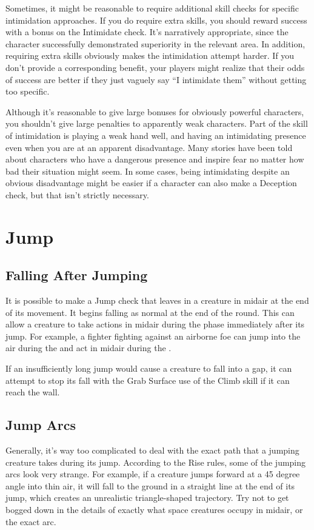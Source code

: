     Sometimes, it might be reasonable to require additional skill checks for specific intimidation approaches.
    If you do require extra skills, you should reward success with a bonus on the Intimidate check.
    It's narratively appropriate, since the character successfully demonstrated superiority in the relevant area.
    In addition, requiring extra skills obviously makes the intimidation attempt harder.
    If you don't provide a corresponding benefit, your players might realize that their odds of success are better if they just vaguely say ``I intimidate them'' without getting too specific.

    Although it's reasonable to give large bonuses for obviously powerful characters, you shouldn't give large penalties to apparently weak characters.
    Part of the skill of intimidation is playing a weak hand well, and having an intimidating presence even when you are at an apparent disadvantage.
    Many stories have been told about characters who have a dangerous presence and inspire fear no matter how bad their situation might seem.
    In some cases, being intimidating despite an obvious disadvantage might be easier if a character can also make a Deception check, but that isn't strictly necessary.

\section{Jump}\label{Jump}

    \subsection{Falling After Jumping}
        It is possible to make a Jump check that leaves in a creature in midair at the end of its movement.
        It begins falling as normal at the end of the round.
        This can allow a creature to take actions in midair during the phase immediately after its jump.
        For example, a fighter fighting against an airborne foe can jump into the air during the  and act in midair during the .

        If an insufficiently long jump would cause a creature to fall into a gap, it can attempt to stop its fall with the Grab Surface use of the Climb skill if it can reach the wall.

    \subsection{Jump Arcs}
        Generally, it's way too complicated to deal with the exact path that a jumping creature takes during its jump.
        According to the Rise rules, some of the jumping arcs look very strange.
        For example, if a creature jumps forward at a 45 degree angle into thin air, it will fall to the ground in a straight line at the end of its jump, which creates an unrealistic triangle-shaped trajectory.
        Try not to get bogged down in the details of exactly what space creatures occupy in midair, or the exact arc.

